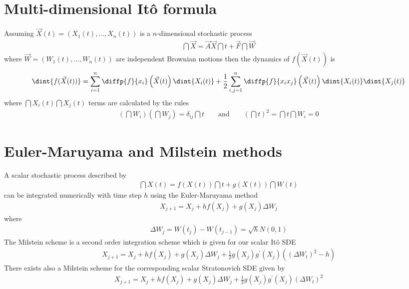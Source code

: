 \documentclass[10pt,a4paper]{article}
\begin{document}
\section{Multi-dimensional Itô formula}
\label{app:multi}

Assuming $\vec{X}(t)=(X_1(t),\ldots,X_n(t))$ is a $n$-dimensional stochastic process
\begin{align}
\dint{\vec{X}} = \vec{A}\vec{X}\dint{t}+\vec{F}\dint{\vec{W}}
\end{align}
where $\vec{W} = (W_1(t),\ldots,W_n(t))$ are independent Brownian motions then the dynamics of
$f(\vec{X}(t))$ is
\begin{align}
\dint{f(\vec{X}(t))} = \sum_{i=1}^n\diffp{f}{{x_i}}\left(\vec{X}(t)\right)\dint{X_i(t)}+
\frac{1}{2}\sum_{i,j=1}^n\diffp{f}{{x_i}{x_j}}\left(\vec{X}(t)\right)\dint{X_i(t)}\dint{X_j(t)}
\end{align}
where $\dint{X_i(t)}\dint{X_j(t)}$ terms are calculated by the rules
\begin{align*}
(\dint{W_i})(\dint{W_j})=\delta_{ij}\dint{t}\qquad\mbox{and}\qquad
(\dint{t})^2 = \dint{t}\dint{W_i}=0
\end{align*}

\section{Euler-Maruyama and Milstein methods}

A scalar stochastic process described by
\begin{align}
\dint{X(t)} = f(X(t))\dint{t}+g(X(t))\dint{W(t)}
\end{align}
can be integrated numerically with time step $h$ using the Euler-Maruyama method 
\begin{align}
X_{j{+}1} = X_j + h f(X_j) + g(X_j)\Delta W_j
\end{align}
where 
\begin{align}
\Delta W_j = W(t_j){-}W(t_{j{-}1}) = \sqrt{h} N(0,1)
\end{align}
The Milstein scheme is a second order integration scheme which is given for our scalar Itô SDE
\begin{align}
X_{j{+}1} = X_j + h f(X_j) + g(X_j)\Delta W_j + \frac{1}{2}g(X_j)g^\prime(X_j)
\left(\left(\Delta W_t\right)^2-h\right)
\end{align}
There exists also a Milstein scheme for the corresponding scalar Stratonovich SDE given by
\begin{align}
X_{j{+}1} = X_j + h f(X_j) + g(X_j)\Delta W_j + \frac{1}{2}g(X_j)g^\prime(X_j)
\left(\Delta W_t\right)^2
\end{align}
\end{document}
